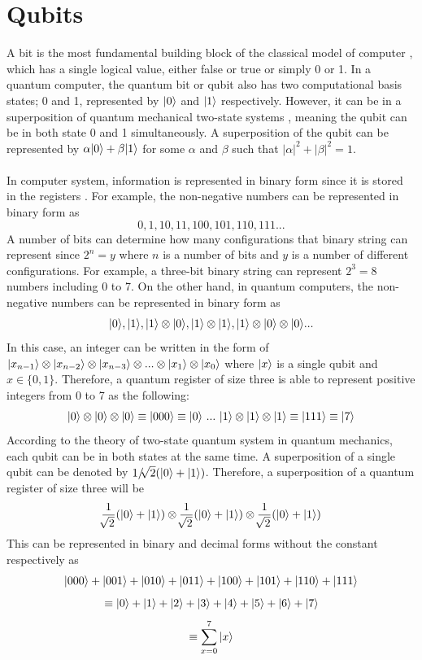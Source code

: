 \documentclass[12pt]{third-rep}
\begin{document}
\section{Qubits}
A bit is the most fundamental building block of the classical model of computer \cite{qc-history}, which has a single logical value, either false or true or simply 0 or 1. In a quantum computer, the quantum bit or qubit also has two computational basis states; 0 and 1, represented by ${\left\vert{0}\right\rangle}$ and ${\left\vert{1}\right\rangle}$ respectively. However, it can be in a superposition of quantum mechanical two-state systems \cite{qc-states}, meaning the qubit can be in both state 0 and 1 simultaneously. A superposition of the qubit can be represented by $\alpha{\left\vert{0}\right\rangle}+\beta{\left\vert{1}\right\rangle}$ for some $\alpha$ and $\beta$ such that $|\alpha|^2+|\beta|^2=1$. \\\\
In computer system, information is represented in binary form since it is stored in the registers \cite{qc-concepts}. For example, the non-negative numbers can be represented in binary form as
$$0,1,10,11,100,101,110,111...$$
A number of bits can determine how many configurations that binary string can represent since $2^n=y$ where $n$ is a number of bits and $y$ is a number of different configurations. For example, a three-bit binary string can represent $2^3=8$ numbers including 0 to 7. On the other hand, in quantum computers, the non-negative numbers can be represented in binary form as
$${\left\vert{0}\right\rangle},{\left\vert{1}\right\rangle},{\left\vert{1}\right\rangle}\otimes{\left\vert{0}\right\rangle},{\left\vert{1}\right\rangle}\otimes{\left\vert{1}\right\rangle},{\left\vert{1}\right\rangle}\otimes{\left\vert{0}\right\rangle}\otimes{\left\vert{0}\right\rangle}...$$
In this case, an integer can be written in the form of ${\left\vert{x_{n-1}}\right\rangle}\otimes{\left\vert{x_{n-2}}\right\rangle}\otimes{\left\vert{x_{n-3}}\right\rangle}\otimes...\otimes{\left\vert{x_1}\right\rangle}\otimes{\left\vert{x_0}\right\rangle}$ where ${\left\vert{x}\right\rangle}$ is a single qubit and $x\in\{0,1\}$. Therefore, a quantum register of size three is able to represent positive integers from 0 to 7 as the following:
$$\ket{0}\otimes\ket{0}\otimes\ket{0}\equiv\ket{000}\equiv\ket{0} \ ...\ \ket{1}\otimes\ket{1}\otimes\ket{1}\equiv\ket{111}\equiv\ket{7}$$
According to the theory of two-state quantum system in quantum mechanics, each qubit can be in both states at the same time. A superposition of a single qubit can be denoted by $1/\sqrt[]{2}({\left\vert{0}\right\rangle}+{\left\vert{1}\right\rangle})$. Therefore, a superposition of a quantum register of size three will be
$$\frac{1}{\sqrt[]{2}}({\left\vert{0}\right\rangle}+{\left\vert{1}\right\rangle})\otimes\frac{1}{\sqrt[]{2}}({\left\vert{0}\right\rangle}+{\left\vert{1}\right\rangle})\otimes\frac{1}{\sqrt[]{2}}({\left\vert{0}\right\rangle}+{\left\vert{1}\right\rangle})$$
This can be represented in binary and decimal forms without the constant respectively as
$${\left\vert{000}\right\rangle}+{\left\vert{001}\right\rangle}+{\left\vert{010}\right\rangle}+{\left\vert{011}\right\rangle}+{\left\vert{100}\right\rangle}+{\left\vert{101}\right\rangle}+{\left\vert{110}\right\rangle}+{\left\vert{111}\right\rangle}$$
$$\equiv{\left\vert{0}\right\rangle}+{\left\vert{1}\right\rangle}+{\left\vert{2}\right\rangle}+{\left\vert{3}\right\rangle}+{\left\vert{4}\right\rangle}+{\left\vert{5}\right\rangle}+{\left\vert{6}\right\rangle}+{\left\vert{7}\right\rangle}$$
$$\equiv\sum_{x=0}^{7}{\left\vert{x}\right\rangle}$$
\end{document}
